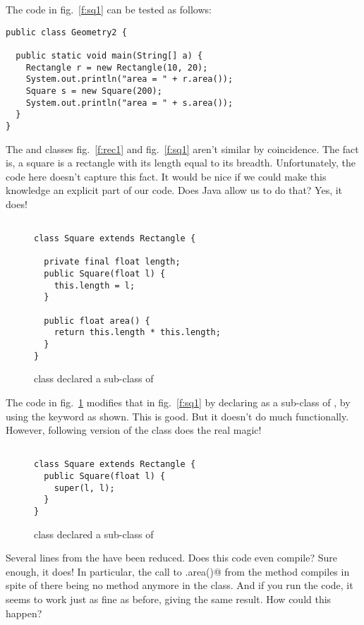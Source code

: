 \documentclass[12pt,a4paper]{article}
\begin{document}
The code in fig.~\ref{f:sq1} can be tested as follows:
\begin{lstlisting}[frame=single]
public class Geometry2 {

  public static void main(String[] a) {
    Rectangle r = new Rectangle(10, 20);
    System.out.println("area = " + r.area());
    Square s = new Square(200);
    System.out.println("area = " + s.area());
  }
}
\end{lstlisting}

The \lstinline@Rectangle@ and \lstinline@Square@ classes fig.~\ref{f:rec1} and fig.~\ref{f:sq1} aren't similar by coincidence. The fact is, a square is a rectangle with its length equal to its breadth. Unfortunately, the code here doesn't capture this fact. It would be nice if we could make this knowledge an explicit part of our code. Does Java allow us to do that? Yes, it does! 
\begin{figure}[H]
\begin{lstlisting}[frame=single]

class Square extends Rectangle {

  private final float length;
  public Square(float l) {
    this.length = l;
  }
  
  public float area() {
    return this.length * this.length;
  }
}
\end{lstlisting}
\caption{\lstinline@Square@ class declared a sub-class of \lstinline@Rectangle@}
\label{f:sq2}
\end{figure}

The code in fig.~\ref{f:sq2} modifies that in fig.~\ref{f:sq1} by declaring \lstinline@Square@ as a sub-class of \lstinline@Rectangle@, by using the \lstinline@extends@ keyword as shown. This is good. But it doesn't do much functionally. However, following version of the \lstinline@Square@ class does the real magic!
\begin{figure}[H]
\begin{lstlisting}[frame=single]

class Square extends Rectangle {
  public Square(float l) {
    super(l, l);
  }
}
\end{lstlisting}
\caption{\lstinline@Square@ class declared a sub-class of \lstinline@Rectangle@}
\label{f:sq3}
\end{figure}

Several lines from the \lstinline@Square@ have been reduced. Does this code even compile? Sure enough, it does! In particular, the call to \lstinline@s.area()@ from the \lstinline@main@ method compiles in spite of there being no \lstinline@area@ method anymore in the \lstinline@Square@ class. And if you run the code, it seems to work just as fine as before, giving the same result. How could this happen?
\end{document}
